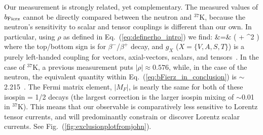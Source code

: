 %
Our measurement is strongly related, yet complementary.  The measured values of $b_{\mathrm{Fierz}}$ cannot be directly compared between the neutron and $^{37}$K, because the neutron's sensitivity to scalar and tensor couplings is different than our own.  In particular, using $\rho$ as defined in Eq.~(\ref{eq:definerho_intro})
we find:
%
\bea
\bFierz &=&  \left(  + \rho^2  \right)
\label{eq:bFierz_in_conclusion}
\eea
where the top/bottom sign is for $\beta^-$/$\beta^+$ decay, and $g_X$ ($X = \{ V,A,S,T\} $) is a purely left-handed coupling for vectors, axial-vectors, scalars, and tensors~\cite{jtw,jtw_coulomb}.
In the case of $^{37}$K, a previous measurement puts $ | \rho | \approx 0.576 $, while, in the case of the neutron, the equivalent quantity within Eq.~(\ref{eq:bFierz_in_conclusion}) is 
$\sim$2.215~\cite{NeutronAbeta2018,Saul2020,UCNAfierz2020}.
The Fermi matrix element, $|M_F|$, is nearly the same for both of these isospin = 1/2 decays (the largest correction is the larger isospin mixing of $\sim$0.01 in $^{37}$K).
This means that our observable is comparatively less sensitive to Lorentz tensor currents, and will predominantly constrain or discover Lorentz scalar currents.  See Fig.~(\ref{fig:exclusionplotfromjohn}).

